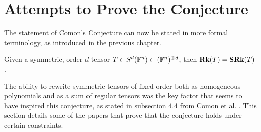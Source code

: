 \documentclass[../Lael_John_MasterThesis_Draft.tex]{subfiles}
\begin{document}

\section{Attempts to Prove the Conjecture}\label{section:pastoverview}
The statement of Comon's Conjecture can now be stated in more formal terminology, as introduced in the previous chapter.

\begin{conjecture}
    Given a symmetric, order-$d$ tensor $T \in S^d(\mathbb{F}^n) \subset (\mathbb{F}^n)^{\otimes d}$, then $\textbf{Rk}(T) = \textbf{SRk}(T)$.
\end{conjecture}

The ability to rewrite symmetric tensors of fixed order both as homogeneous polynomials and as a sum of regular tensors was the key factor that seems to have inspired this conjecture, as stated in subsection 4.4 from Comon et al. \cite{comon_symmetric_2008}. This section details some of the papers that prove that the conjecture holds under certain constraints.
\end{document}
